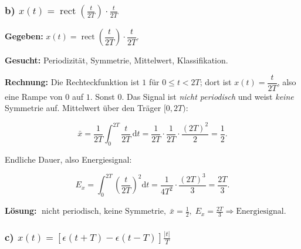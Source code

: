 \subsubsection*{b) $x(t) = \operatorname{rect}\!\left(\frac{t}{2T}\right)\cdot\frac{t}{2T}$}

\begin{beispiel}

\textbf{Gegeben:} $x(t) = \operatorname{rect}\!\left(\dfrac{t}{2T}\right)
\cdot \dfrac{t}{2T}$.

\textbf{Gesucht:} Periodizität, Symmetrie, Mittelwert, Klassifikation.

\textbf{Rechnung:} Die Rechteckfunktion ist $1$ für $0 \leq t < 2T$; dort ist
$x(t) = \dfrac{t}{2T}$, also eine Rampe von $0$ auf $1$. Sonst $0$. Das Signal
ist \emph{nicht periodisch} und weist \emph{keine} Symmetrie auf. Mittelwert
über den Träger $[0, 2T)$:

$$
\bar{x} = \frac{1}{2T}\int_0^{2T} \frac{t}{2T}\,\mathrm{d}t
        = \frac{1}{2T}\cdot\frac{1}{2T}\cdot\frac{(2T)^2}{2} = \frac{1}{2}.
$$

Endliche Dauer, also Energiesignal:

$$
E_x = \int_0^{2T} \left(\frac{t}{2T}\right)^2 \mathrm{d}t
    = \frac{1}{4T^2}\cdot\frac{(2T)^3}{3} = \frac{2T}{3}.
$$

\begin{center}
\end{center}

\textbf{Lösung:}
$\boxed{\;\text{nicht periodisch, keine Symmetrie},\; \bar{x} = \tfrac12,\;
E_x = \tfrac{2T}{3} \Rightarrow \text{Energiesignal.}\;}$

\end{beispiel}

\subsubsection*{c) $x(t) = \left[\epsilon(t+T) - \epsilon(t-T)\right]\frac{|t|}{T}$}

